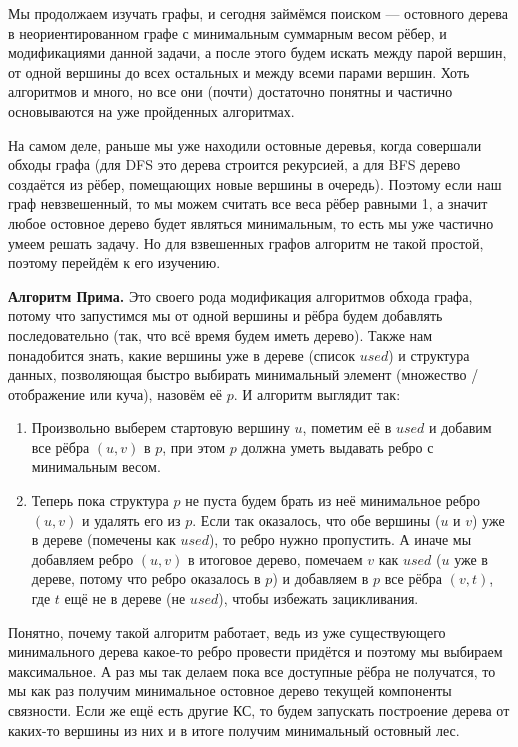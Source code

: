 Мы продолжаем изучать графы, и сегодня займёмся поиском  — остовного дерева в неориентированном графе с минимальным суммарным весом рёбер, и модификациями данной задачи, а после этого будем искать  между парой вершин, от одной вершины до всех остальных и между всеми парами вершин. Хоть алгоритмов и много, но все они (почти) достаточно понятны и частично основываются на уже пройденных алгоритмах.


На самом деле, раньше мы уже находили остовные деревья, когда совершали обходы графа (для DFS это дерева строится рекурсией, а для BFS дерево создаётся из рёбер, помещающих новые вершины в очередь). Поэтому если наш граф невзвешенный, то мы можем считать все веса рёбер равными 1, а значит любое остовное дерево будет являться минимальным, то есть мы уже частично умеем решать задачу. Но для взвешенных графов алгоритм не такой простой, поэтому перейдём к его изучению.

\textbf{Алгоритм Прима.} Это своего рода модификация алгоритмов обхода графа, потому что запустимся мы от одной вершины и рёбра будем добавлять последовательно (так, что всё время будем иметь дерево). Также нам понадобится знать, какие вершины уже в дереве (список $used$) и структура данных, позволяющая быстро выбирать минимальный элемент (множество / отображение или куча), назовём её $p$. И алгоритм выглядит так:

\begin{enumerate}
    \item Произвольно выберем стартовую вершину $u$, пометим её в $used$ и добавим все рёбра $(u, v)$ в $p$, при этом $p$ должна уметь выдавать ребро с минимальным весом.
    \item Теперь пока структура $p$ не пуста будем брать из неё минимальное ребро $(u, v)$ и удалять его из $p$. Если так оказалось, что обе вершины ($u$ и $v$) уже в дереве (помечены как $used$), то ребро нужно пропустить. А иначе мы добавляем ребро $(u, v)$ в итоговое дерево, помечаем $v$ как $used$ ($u$ уже в дереве, потому что ребро оказалось в $p$) и добавляем в $p$ все рёбра $(v, t)$, где $t$ ещё не в дереве (не $used$), чтобы избежать зацикливания.
\end{enumerate}

Понятно, почему такой алгоритм работает, ведь из уже существующего минимального дерева какое-то ребро провести придётся и поэтому мы выбираем максимальное. А раз мы так делаем пока все доступные рёбра не получатся, то мы как раз получим минимальное остовное дерево текущей компоненты связности. Если же ещё есть другие КС, то будем запускать построение дерева от каких-то вершины из них и в итоге получим минимальный остовный лес.

